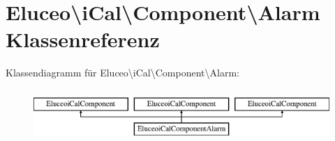 \hypertarget{class_eluceo_1_1i_cal_1_1_component_1_1_alarm}{}\section{Eluceo\textbackslash{}i\+Cal\textbackslash{}Component\textbackslash{}Alarm Klassenreferenz}
\label{class_eluceo_1_1i_cal_1_1_component_1_1_alarm}
Klassendiagramm für Eluceo\textbackslash{}i\+Cal\textbackslash{}Component\textbackslash{}Alarm\+:\begin{figure}[H]
\begin{center}
\leavevmode
\includegraphics[height=1.975309cm]{class_eluceo_1_1i_cal_1_1_component_1_1_alarm}
\end{center}
\end{figure}
